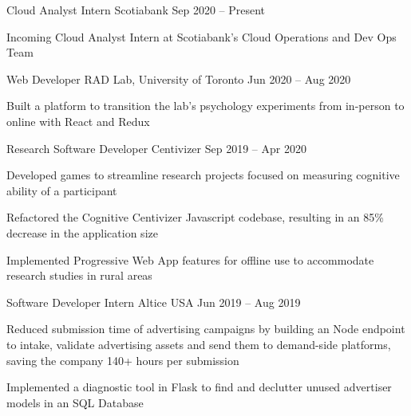 \begin{cventries}
  \cventry
    {Cloud Analyst Intern}
    {Scotiabank}
    {}
    {Sep 2020 -- Present}
    {}
    {
      \begin{cvitems}
        \item {Incoming Cloud Analyst Intern at Scotiabank's Cloud Operations and Dev Ops Team}
      \end{cvitems}
    }

  \cventry
    {Web Developer}
    {RAD Lab, University of Toronto}
    {}
    {Jun 2020 -- Aug 2020}
    {}
    {
      \begin{cvitems}
        \item {Built a platform to transition the lab's psychology experiments from in-person to online with React and Redux}
      \end{cvitems}
    }

  \cventry
    {Research Software Developer}
    {Centivizer}
    {}
    {Sep 2019 -- Apr 2020}
    {}
    {
      \begin{cvitems}
        \item {Developed games to streamline research projects focused on measuring cognitive ability of a participant}
        \item {Refactored the Cognitive Centivizer Javascript codebase, resulting in an 85\% decrease in the application size}
        \item {Implemented Progressive Web App features for offline use to accommodate research studies in rural areas}
      \end{cvitems}
    }

  \cventry
    {Software Developer Intern}
    {Altice USA}
    {}
    {Jun 2019 -- Aug 2019}
    {}
    {
    \begin{cvitems}
      \item {Reduced submission time of advertising campaigns by building an Node endpoint to intake, validate advertising assets and send them to demand-side platforms, saving the company 140+ hours per submission}
      \item {Implemented a diagnostic tool in Flask to find and declutter unused advertiser models in an SQL Database}
    \end{cvitems}
    }


\end{cventries}
